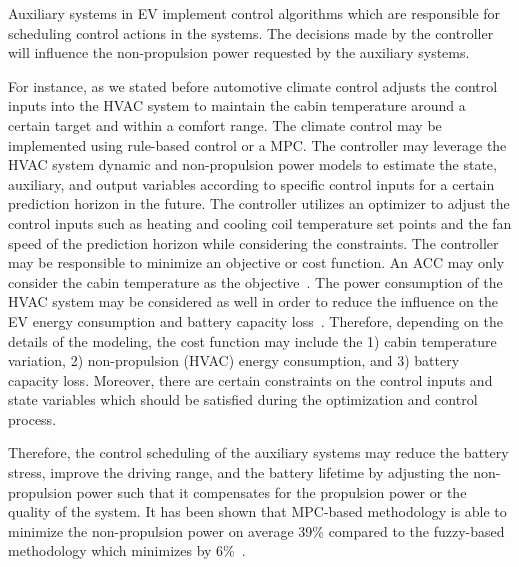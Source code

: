 Auxiliary systems in EV implement control algorithms which are responsible for scheduling control actions in the systems. The decisions made by the controller will influence the non-propulsion power requested by the auxiliary systems.

For instance, as we stated before automotive climate control adjusts the control inputs into the HVAC system to maintain the cabin temperature around a certain target and within a comfort range. The climate control may be implemented using rule-based control or a MPC. The controller may leverage the HVAC system dynamic and non-propulsion power models to estimate the state, auxiliary, and output variables according to specific control inputs for a certain prediction horizon in the future. The controller utilizes an optimizer to adjust the control inputs such as heating and cooling coil temperature set points and the fan speed of the prediction horizon while considering the constraints. The controller may be responsible to minimize an objective or cost function. An ACC may only consider the cabin temperature as the objective~\cite{AF_30,AF_31,AF_32,AF_33}. The power consumption of the HVAC system may be considered as well in order to reduce the influence on the EV energy consumption and battery capacity loss~\cite{AF_10,AF_29}. Therefore, depending on the details of the modeling, the cost function may include the 1) cabin temperature variation, 2) non-propulsion (HVAC) energy consumption, and 3) battery capacity loss. Moreover, there are certain constraints on the control inputs and state variables which should be satisfied during the optimization and control process.

Therefore, the control scheduling of the auxiliary systems may reduce the battery stress, improve the driving range, and the battery lifetime by adjusting the non-propulsion power such that it compensates for the propulsion power or the quality of the system. It has been shown that MPC-based methodology is able to minimize the non-propulsion power on average 39\% compared to the fuzzy-based methodology which minimizes by 6\%~\cite{AF_10,AF_32,AF_43}.


